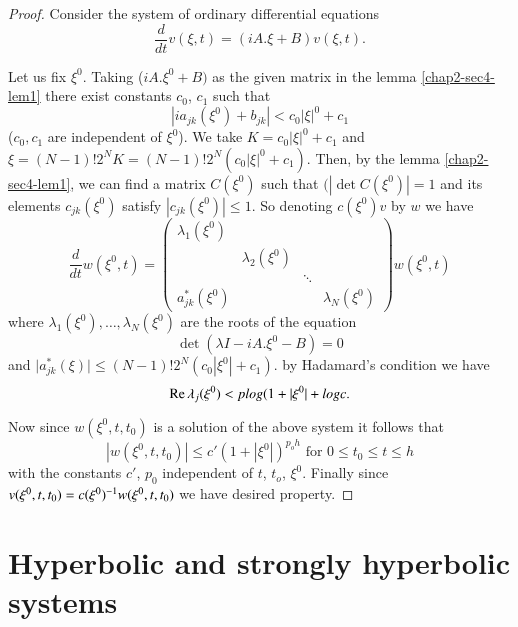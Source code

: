 \begin{proof}
Consider the system of ordinary differential equations
\begin{equation}
\frac{d}{dt}v(\xi, t) = (iA.\xi + B) v(\xi,  t). \tag{4.11}\label{chap2-eq4.11}
\end{equation}

Let us fix $\xi^0$. Taking ($iA. \xi^0  + B)$ as the given matrix in
the lemma \ref{chap2-sec4-lem1} there exist constants $c_0$, $c_1$ such that  
\begin{equation}
 |i a_{jk}(\xi^0 ) + b_{jk} |< c_0 |\xi |^0 + c_1 \tag{4.12}\label{chap2-eq4.12}
\end{equation}
($c_0, c_1$ are independent of $\xi^0$). We take $K=c_0 |\xi |^0 +
c_1$ and $\xi = (N-1) ! 2^N K = (N-1) ! 2^N (c_0|\xi|^0 + c_1)$. Then,
by the lemma \ref{chap2-sec4-lem1},  we can find a matrix $ C(\xi^0) $
such that $ (|\det C(\xi^0)| = 1 $   and its elements $c_{jk} (\xi^0)$ satisfy
$|c_{jk}(\xi^0) | \leq 1$. So denoting $c(\xi^0) v$ by $w$ we have  
\begin{equation}
\frac{d}{dt} w(\xi^0, t) = 
\begin{pmatrix}  
\lambda_1(\xi^0) & & &\\
 & \lambda_2(\xi^0) & & \\
 & & \ddots & \\ 
a^*_{jk}(\xi^0) & & & \lambda_{N}(\xi^0) 
\end{pmatrix} 
w(\xi^0 , t) \tag{4.13}\label{chap2-eq4.13} 
\end{equation}\pageoriginale
where  $\lambda_1 (\xi^0), \ldots ,  \lambda_N (\xi^0) $ are the roots
of the equation 
\begin{equation}
\det(\lambda I - i A. \xi^0 - B) = 0 \tag{4.14}\label{chap2-eq4.14}
\end{equation}
and $\big|a^*_{jk}(\xi) \big| \leq (N-1)! 2^N (c_0 | \xi^0 | + c_1)$. by 
Hadamard's condition we have  
$$
\operatorname{Re} \lambda_j(\xi^0)< p log ( 1+ | \xi ^0 | + log c.
$$

Now since $w(\xi^0, t, t_0) $ is a solution of the above system it
follows that  
$$
|w(\xi^0, t, t_0) | \leq c' (1+ |\xi^0|)^{p_o h} \text{ for } 0\leq
t_0 \leq t \leq h  
$$
with the constants $c'$, $p_0$ independent of $t$, $t_o$, $\xi^0$.
Finally since $v(\xi^0, t, t_0)\break = c(\xi^0)^{-1} w ( \xi^0 , t, t_0)$
we have desired property.  
\end{proof}

\section{Hyperbolic and strongly hyperbolic systems}\label{chap2-sec5}%

